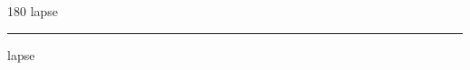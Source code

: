 
\begin{frame}
\begin{center}
\begin{turn}{180}
{\fontsize{2.5cm}{1em}\selectfont lapse}
\end{turn}
\vspace{1em}\par  
\hrule
\vspace{1em}\par  
{\fontsize{2.5cm}{1em}\selectfont lapse}
\end{center}
\end{frame}
